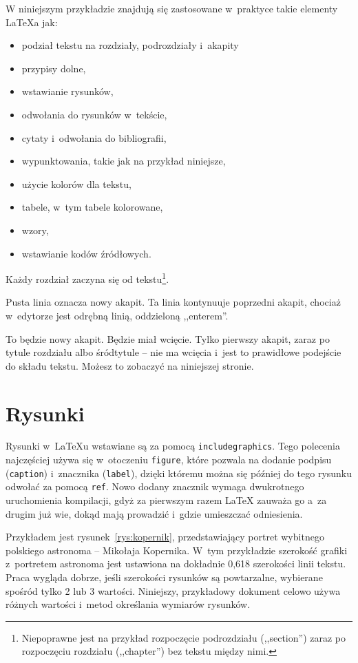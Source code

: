 W niniejszym przykładzie znajdują się zastosowane w~praktyce takie elementy \LaTeX{a} jak:
\begin{itemize}
    \item podział tekstu na rozdziały, podrozdziały i~akapity
    \item przypisy dolne,
    \item wstawianie rysunków,
    \item odwołania do rysunków w~tekście,
    \item cytaty i~odwołania do bibliografii,
    \item wypunktowania, takie jak na przykład niniejsze,
    \item użycie kolorów dla tekstu,
    \item tabele, w~tym tabele kolorowane, %
    \item wzory, %
    \item wstawianie kodów źródłowych.
\end{itemize}

Każdy rozdział zaczyna się od tekstu\footnote{Niepoprawne jest na przykład rozpoczęcie podrozdziału (,,section'') zaraz po rozpoczęciu rozdziału (,,chapter'') bez tekstu między nimi.}.

Pusta linia oznacza nowy akapit.
Ta linia kontynuuje poprzedni akapit, chociaż w~edytorze jest odrębną linią, oddzieloną ,,enterem''.

To będzie nowy akapit. Będzie miał wcięcie. Tylko pierwszy akapit, zaraz po tytule rozdziału albo śródtytule -- nie ma wcięcia i~jest to prawidłowe podejście do składu tekstu. Możesz to zobaczyć na niniejszej stronie.


\section{Rysunki}
Rysunki w~\LaTeX{u} wstawiane są za pomocą \texttt{includegraphics}. Tego polecenia najczęściej używa się w~otoczeniu \texttt{figure}, które pozwala na dodanie podpisu (\texttt{caption}) i~znacznika (\texttt{label}), dzięki któremu można się później do tego rysunku odwołać za pomocą \texttt{ref}. Nowo dodany znacznik wymaga dwukrotnego uruchomienia kompilacji, gdyż za pierwszym razem \LaTeX{} zauważa go a~za drugim już wie, dokąd mają prowadzić i~gdzie umieszczać odniesienia.

Przykładem jest rysunek~\ref{rys:kopernik}, przedstawiający portret wybitnego polskiego astronoma -- Mikołaja Kopernika. W~tym przykładzie szerokość grafiki z~portretem astronoma jest ustawiona na dokładnie 0,618 szerokości linii tekstu. Praca wygląda dobrze, jeśli szerokości rysunków są powtarzalne, wybierane spośród tylko 2 lub 3 wartości. Niniejszy, przykładowy dokument celowo używa różnych wartości i~metod określania wymiarów rysunków.

